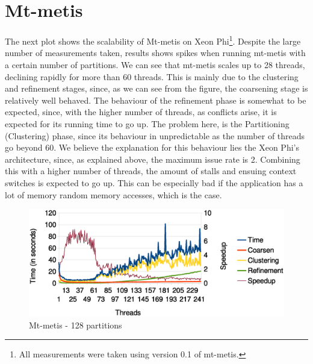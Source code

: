 \documentclass[abstract=on,9pt,twocolumn]{scrartcl}
\begin{document}

\section{Mt-metis}
\label{sec:mt-metis}

The next plot shows the scalability of Mt-metis on Xeon Phi\footnote{All measurements were taken using version 0.1 of mt-metis.}. 
Despite the large number of measurements taken, results shows spikes when running mt-metis with a certain number of partitions. We can see that
mt-metis scales up to 28 threads, declining rapidly for more than 60 threads. 
This is mainly due to the clustering and refinement stages, since, as we can see from the figure, the coarsening stage is relatively well behaved. 
The behaviour of the refinement phase is somewhat to be expected, since, with the higher number of threads, as conflicts arise, it is expected for its running time to go up.
The problem here, is the Partitioning (Clustering) phase, since its behaviour in unpredictable as the number of threads go beyond 60. We believe the explanation for this behaviour lies the Xeon Phi's architecture, since, as explained above, the maximum issue rate is 2. Combining this with a higher number of threads, the amount of stalls and ensuing context switches is expected to go up. This can be especially bad if the application has a lot of memory random memory accesses, which is the case.  

\begin{center}
\begin{figure}[htb]
    \includegraphics[width=\columnwidth]{img/mtmetis128.eps}
    \caption{Mt-metis - 128 partitions}
    \label{img:mtmetis128}
\end{figure}
\end{center}
\end{document}
